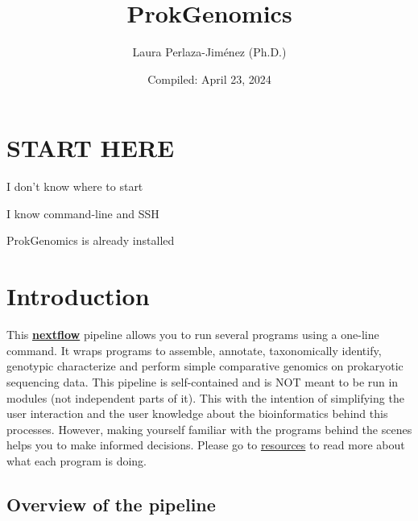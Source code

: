 \documentclass[
]{book}
\title{ProkGenomics}
\author{Laura Perlaza-Jiménez (Ph.D.)}
\date{Compiled: April 23, 2024}
\begin{document}
\maketitle

{
\setcounter{tocdepth}{1}
\tableofcontents
}
\hypertarget{start-here}{%
\chapter{START HERE}\label{start-here}}

{I don't know where to start}

{I know command-line and SSH}

{ProkGenomics is already installed }

\hypertarget{introduction}{%
\chapter{Introduction}\label{introduction}}

This \textbf{\href{https://www.nextflow.io/}{nextflow}} pipeline allows you to run several programs using a one-line command. It wraps programs to assemble, annotate, taxonomically identify, genotypic characterize and perform simple comparative genomics on prokaryotic sequencing data. This pipeline is self-contained and is NOT meant to be run in modules (not independent parts of it). This with the intention of simplifying the user interaction and the user knowledge about the bioinformatics behind this processes. However, making yourself familiar with the programs behind the scenes helps you to make informed decisions. Please go to \href{resources.html}{resources} to read more about what each program is doing.

\hypertarget{overview-of-the-pipeline}{%
\section{Overview of the pipeline}\label{overview-of-the-pipeline}}
\end{document}
